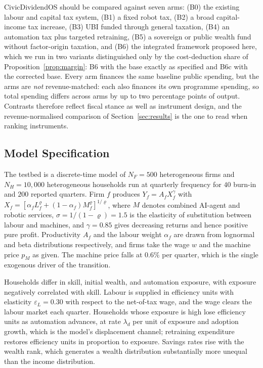 \documentclass[journal]{IEEEtran}
\theoremstyle{plain}
\theoremstyle{definition}
\begin{document}
CivicDividendOS should be compared against seven arms: (B0) the existing labour and capital tax system, (B1) a fixed robot tax, (B2) a broad capital-income tax increase, (B3) UBI funded through general taxation, (B4) an automation tax plus targeted retraining, (B5) a sovereign or public wealth fund without factor-origin taxation, and (B6) the integrated framework proposed here, which we run in two variants distinguished only by the cost-deduction share of Proposition~\ref{prop:margin}: B6 with the base exactly as specified and B6c with the corrected base. Every arm finances the same baseline public spending, but the arms are \emph{not} revenue-matched: each also finances its own programme spending, so total spending differs across arms by up to two percentage points of output. Contrasts therefore reflect fiscal stance as well as instrument design, and the revenue-normalised comparison of Section~\ref{sec:results} is the one to read when ranking instruments.

\subsection{Model Specification}
\label{sec:model}

The testbed is a discrete-time model of $N_F = 500$ heterogeneous firms and $N_H = 10{,}000$ heterogeneous households run at quarterly frequency for $40$ burn-in and $200$ reported quarters. Firm $f$ produces $Y_f = A_f X_f^{\gamma}$ with $X_f = [\alpha_f L_f^{\varrho} + (1-\alpha_f)M_f^{\varrho}]^{1/\varrho}$, where $M$ denotes combined AI-agent and robotic services, $\sigma = 1/(1-\varrho) = 1.5$ is the elasticity of substitution between labour and machines, and $\gamma = 0.85$ gives decreasing returns and hence positive pure profit. Productivity $A_f$ and the labour weight $\alpha_f$ are drawn from lognormal and beta distributions respectively, and firms take the wage $w$ and the machine price $p_M$ as given. The machine price falls at $0.6\%$ per quarter, which is the single exogenous driver of the transition.

Households differ in skill, initial wealth, and automation exposure, with exposure negatively correlated with skill. Labour is supplied in efficiency units with elasticity $\varepsilon_L = 0.30$ with respect to the net-of-tax wage, and the wage clears the labour market each quarter. Households whose exposure is high lose efficiency units as automation advances, at rate $\lambda_d$ per unit of exposure and adoption growth, which is the model's displacement channel; retraining expenditure restores efficiency units in proportion to exposure. Savings rates rise with the wealth rank, which generates a wealth distribution substantially more unequal than the income distribution.
\end{document}
